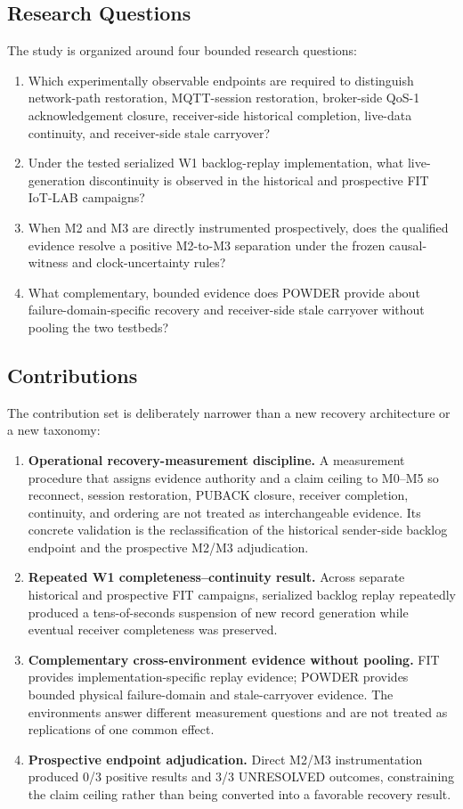 \documentclass[journal]{IEEEtran}
\begin{document}
\subsection{Research Questions}
The study is organized around four bounded research questions:
\begin{enumerate}
    \item[\textbf{RQ1}] Which experimentally observable endpoints are required to distinguish network-path restoration, MQTT-session restoration, broker-side QoS-1 acknowledgement closure, receiver-side historical completion, live-data continuity, and receiver-side stale carryover?
    \item[\textbf{RQ2}] Under the tested serialized W1 backlog-replay implementation, what live-generation discontinuity is observed in the historical and prospective FIT IoT-LAB campaigns?
    \item[\textbf{RQ3}] When M2 and M3 are directly instrumented prospectively, does the qualified evidence resolve a positive M2-to-M3 separation under the frozen causal-witness and clock-uncertainty rules?
    \item[\textbf{RQ4}] What complementary, bounded evidence does POWDER provide about failure-domain-specific recovery and receiver-side stale carryover without pooling the two testbeds?
\end{enumerate}

\subsection{Contributions}
The contribution set is deliberately narrower than a new recovery architecture or a new taxonomy:
\begin{enumerate}
    \item[\textbf{A1}] \textbf{Operational recovery-measurement discipline.} A measurement procedure that assigns evidence authority and a claim ceiling to M0--M5 so reconnect, session restoration, PUBACK closure, receiver completion, continuity, and ordering are not treated as interchangeable evidence. Its concrete validation is the reclassification of the historical sender-side backlog endpoint and the prospective M2/M3 adjudication.
    \item[\textbf{A2}] \textbf{Repeated W1 completeness--continuity result.} Across separate historical and prospective FIT campaigns, serialized backlog replay repeatedly produced a tens-of-seconds suspension of new record generation while eventual receiver completeness was preserved.
    \item[\textbf{A3}] \textbf{Complementary cross-environment evidence without pooling.} FIT provides implementation-specific replay evidence; POWDER provides bounded physical failure-domain and stale-carryover evidence. The environments answer different measurement questions and are not treated as replications of one common effect.
    \item[\textbf{A4}] \textbf{Prospective endpoint adjudication.} Direct M2/M3 instrumentation produced 0/3 positive results and 3/3 UNRESOLVED outcomes, constraining the claim ceiling rather than being converted into a favorable recovery result.
\end{enumerate}
\end{document}

